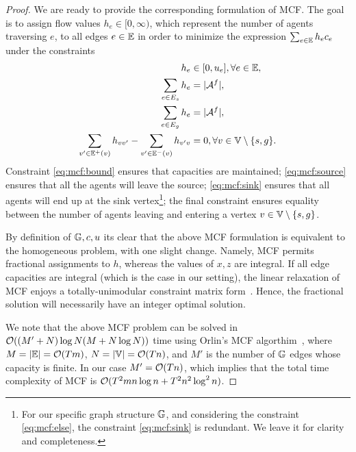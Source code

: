 \documentclass[conference]{IEEEtran}
\begin{document}
\begin{proof}
We are ready to provide the corresponding formulation of MCF. The goal is to assign flow values $h_e\in [0,\infty)$, which represent the number of agents traversing $e$, to all edges $e\in \mathbb{E}$ in order to minimize the expression $\sum_{e\in \mathbb{E}}h_e c_e$ under the constraints 
\begin{subequations}
\begin{align}
 h_{e}&\in [0,u_e],  \forall e\in \mathbb{E},\label{eq:mcf:bound}\\
 \sum_{e\in E_s}h_{e}& =|\mathcal{A}^f|, \label{eq:mcf:source}\\
  \sum_{e\in E_g}h_{e}& =|\mathcal{A}^f|, \label{eq:mcf:sink}\\
  \sum_{v'\in \mathbb{E}^+(v)}h_{vv'}-\sum_{v'\in \mathbb{E}^-(v)}h_{v'v}&= 0, \forall v\in \mathbb{V}\setminus \{s,g\}.\label{eq:mcf:else}
\end{align}
\end{subequations}
Constraint \eqref{eq:mcf:bound} ensures that capacities are maintained; \eqref{eq:mcf:source} ensures that all the agents will leave the source; \eqref{eq:mcf:sink} ensures that all agents will end up at the sink vertex\footnote{For our specific graph structure $\mathbb{G}$, and considering the constraint \eqref{eq:mcf:else}, the constraint \eqref{eq:mcf:sink} is redundant. We leave it for clarity and completeness.}; the final constraint ensures equality between the number of agents leaving and entering a vertex $v\in \mathbb{V}\setminus \{s,g\}$.

By definition of $\mathbb{G},c,u$ its clear that the above MCF formulation is equivalent to the homogeneous problem, with one slight change. Namely, MCF permits fractional assignments to $h$, whereas the values of $x,z$ are integral. If all edge capacities are integral (which is the case in our setting), the linear relaxation of MCF enjoys a totally-unimodular constraint matrix form~\cite{AhujaETAL93}. Hence, the fractional solution will necessarily have an integer optimal solution. 

We note that the above MCF problem can be solved in $\mathcal{O}((M'+N)\log N(M+N\log N))$ time using Orlin's MCF algorthim~\cite{Orlin93,Williamson2019}, where $M=|\mathbb{E}|=\mathcal{O}(Tm)$, $N=|\mathbb{V}|=\mathcal{O}(Tn)$, and $M'$ is the number of $\mathbb{G}$ edges whose capacity is finite. In our case $M'=\mathcal{O}(Tn)$, which implies that the total time complexity of MCF is $\mathcal{O}(T^2mn\log n+T^2n^2\log^2n)$. 



\end{proof}
\end{document}
